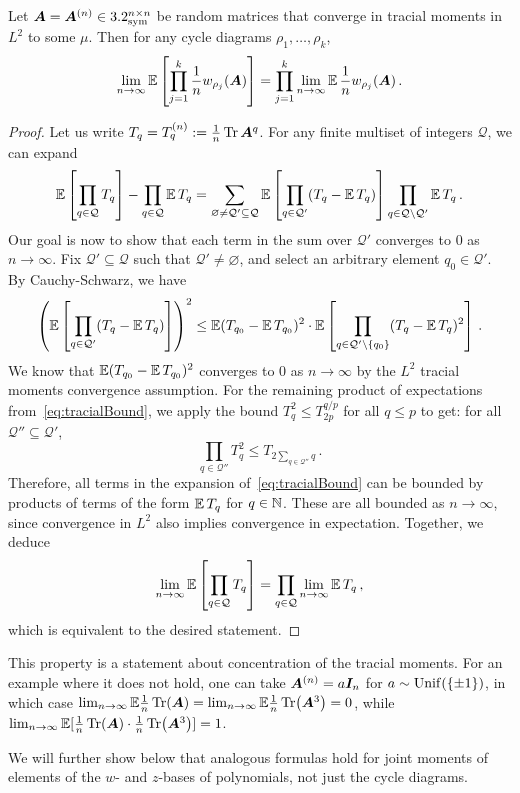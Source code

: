 \begin{lemma}\label{lem:factorization}
    Let ${\bm A} = {\bm A}^{(n)} \in 3.2^{n \times n}_{\mathrm{sym}}$ be  random  matrices that converge in tracial moments in $L^2$ to some $\mu$. Then for any cycle diagrams
    $\rho_1, \ldots, \rho_k$,
    \[
        \lim_{n\to\infty} \operatorname*{\mathbb{E}}\left[\prod_{j=1}^k \frac 1n w_{\rho_j}({\bm A})\right] = \prod_{j=1}^k \lim_{n\to\infty}  \operatorname*{\mathbb{E}} \frac 1n w_{\rho_j}({\bm A})\,.
    \]
\end{lemma}

\begin{proof}
    Let us write $T_q = T_q^{(n)} := \frac 1n \Tr \bm A^q$. For
    any finite multiset of integers $\mathcal Q$, we can expand
    \[
        \operatorname*{\mathbb{E}} \left[\prod_{q\in {\cal Q}} T_{q}\right] - \prod_{q\in {\cal Q}} \operatorname*{\mathbb{E}} T_{q} = \sum_{\varnothing \neq {\cal Q}'\subseteq {\cal Q}} \operatorname*{\mathbb{E}}\left[\prod_{q\in {\cal Q}'} (T_{q} - \operatorname*{\mathbb{E}} T_{q})\right] \prod_{q\in {\cal Q}\setminus {\cal Q}'} \operatorname*{\mathbb{E}} T_{q}\,.
    \]
    Our goal is now to show that each term in the
    sum over $\mathcal Q'$ converges to $0$ as $n\to\infty$. Fix $\mathcal Q'\subseteq \mathcal Q$ such that $\mathcal Q'\neq\varnothing$, and select an arbitrary element $q_0\in \mathcal Q'$. By Cauchy-Schwarz, we have
    \begin{equation}
        \left(\operatorname*{\mathbb{E}}\left[\prod_{q\in {\cal Q}'} (T_{q} - \operatorname*{\mathbb{E}} T_{q})\right]\right)^2 \le \operatorname*{\mathbb{E}} (T_{q_0} - \operatorname*{\mathbb{E}} T_{q_0})^2 \cdot \operatorname*{\mathbb{E}} \left[\prod_{q\in {\cal Q}'\setminus \{q_0\}} (T_q - \operatorname*{\mathbb{E}} T_q)^2\right]\,.\label{eq:tracialBound}
    \end{equation}
    We know that $\operatorname*{\mathbb{E}} (T_{q_0} - \operatorname*{\mathbb{E}} T_{q_0})^2$
    converges to $0$ as $n\to\infty$
    by the $L^2$ tracial moments convergence assumption.  For the remaining product of expectations from~\cref{eq:tracialBound}, we apply
    the bound $T_q^2\le T_{2p}^{q/p}$ for all $q\le p$ to get: for all $\mathcal Q''\subseteq \mathcal Q'$,
    \[
        \prod_{q\in \mathcal Q''} T_q^2\le T_{2\sum_{q\in \mathcal Q''} q}\,.
    \]
    Therefore, all terms in the expansion of~\cref{eq:tracialBound} can be bounded
    by products of terms of the form $\operatorname*{\mathbb{E}} T_q$ for
    $q\in\mathbb{N}$. These are all bounded as $n\to\infty$, since convergence in $L^2$ 
    also implies convergence in expectation.
    Together, we deduce
    \[
        \lim_{n\to\infty} \operatorname*{\mathbb{E}} \left[\prod_{q\in {\cal Q}} T_{q}\right] = \prod_{q\in {\cal Q}} \lim_{n\to\infty}\operatorname*{\mathbb{E}} T_{q}\,,
    \]
    which is equivalent to the desired statement.
\end{proof}

\begin{remark}
    \label{rem:cdm-factorization}
    This property is a statement about concentration of the tracial moments.
    For an example where it does not hold, one can take ${\bm A}^{(n)} = a\bm I_n$ for $a \sim \mathrm{Unif}(\{\pm 1\})$, in which case $\lim_{n \to \infty}\mathbb{E} \frac{1}{n}\Tr({\bm A}) = \lim_{n \to \infty} \mathbb{E} \frac{1}{n}\Tr({\bm A}^3) = 0$, while $\lim_{n \to \infty} \mathbb{E} [\frac{1}{n}\Tr({\bm A}) \cdot \frac{1}{n}\Tr({\bm A}^3)] = 1$.
\end{remark}
\noindent
We will further show below that analogous formulas hold for joint moments of elements of the $w$- and $z$-bases of polynomials, not just the cycle diagrams.

